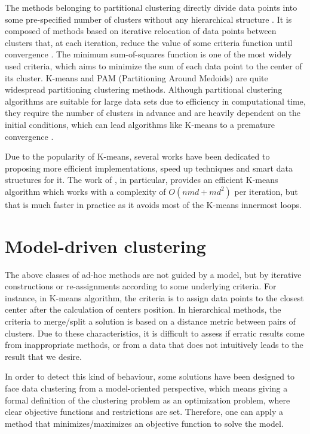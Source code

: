 The methods belonging to partitional clustering directly divide data points into some pre-specified number of clusters without any hierarchical structure \cite{Xu2005}. It is composed of methods based on iterative relocation of data points between clusters that, at each iteration, reduce the value of some criteria function until convergence \cite{Karkkainen2006}. The minimum sum-of-squares function is one of the most widely used criteria, which aims to minimize the sum of each data point to the center of its cluster. K-means and PAM (Partitioning Around Medoids) are quite widespread partitioning clustering methods. Although partitional clustering algorithms are suitable for large data sets due to efficiency in computational time, they require the number of clusters in advance and are heavily dependent on the initial conditions, which can lead algorithms like K-means to a premature convergence \cite{Das2009}.

Due to the popularity of K-means, several works have been dedicated to proposing more efficient implementations, speed up techniques and smart data structures for it. The work of \cite{Hamerly2010}, in particular, provides an efficient K-means algorithm which works with a complexity of $O(nmd + md^2)$ per iteration, but that is much faster in practice as it avoids most of the K-means innermost loops.

\section{Model-driven clustering}
The above classes of ad-hoc methods are not guided by a model, but by iterative constructions or re-assignments according to some underlying criteria. For instance, in K-means algorithm, the criteria is to assign data points to the closest center after the calculation of centers position. In hierarchical methods, the criteria to merge/split a solution is based on a distance metric between pairs of clusters. Due to these characteristics, it is difficult to assess if erratic results come from inappropriate methods, or from a data that does not intuitively leads to the result that we desire.

In order to detect this kind of behaviour, some solutions have been designed to face data clustering from a model-oriented perspective, which means giving a formal definition of the clustering problem as an optimization problem, where clear objective functions and restrictions are set. Therefore, one can apply a method that minimizes/maximizes an objective function to solve the model.

